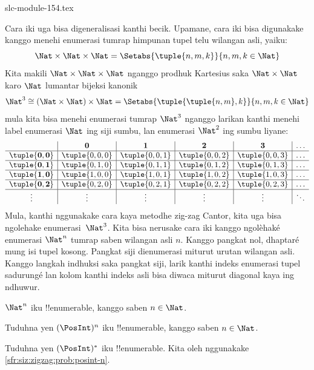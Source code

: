 \begin{filecontents*}[overwrite]{slc-module-154.tex}
\begin{explain}
Cara iki uga bisa digeneralisasi kanthi becik. Upamane, cara iki bisa
digunakake kanggo menehi enumerasi tumrap himpunan tupel telu wilangan asli, yaiku:
\[
\Nat \times \Nat \times \Nat = \Setabs{\tuple{n,m,k}}{n,m,k \in \Nat}
\]
Kita makili $\Nat \times \Nat \times \Nat$ nganggo prodhuk
Kartesius saka $\Nat \times \Nat$ karo $\Nat$ lumantar bijeksi kanonik
\[
\Nat^3 \cong (\Nat \times \Nat) \times \Nat =
\Setabs{\tuple{\tuple{n,m},k}}{n, m, k
  \in \Nat }
\]
mula kita bisa menehi enumerasi tumrap $\Nat^3$ nganggo larikan kanthi menehi label
enumerasi $\Nat$ ing siji sumbu, lan enumerasi
$\Nat^2$ ing sumbu liyane:
\[
\begin{array}{ c | c | c | c | c | c}
& \mathbf 0 & \mathbf 1 & \mathbf 2 & \mathbf 3 & \dots \\
\hline
\mathbf{\tuple{0,0}} & \tuple{0,0,0} & \tuple{0,0,1} & \tuple{0,0,2} & \tuple{0,0,3} & \dots \\
\hline
\mathbf{\tuple{0,1}} & \tuple{0,1,0} & \tuple{0,1,1} & \tuple{0,1,2} & \tuple{0,1,3} & \dots \\
\hline
\mathbf{\tuple{1,0}} & \tuple{1,0,0} & \tuple{1,0,1} & \tuple{1,0,2} & \tuple{1,0,3} & \dots \\
\hline
\mathbf{\tuple{0,2}} & \tuple{0,2,0} & \tuple{0,2,1} & \tuple{0,2,2} & \tuple{0,2,3} & \dots\\
\hline
\vdots & \vdots & \vdots & \vdots & \vdots & \ddots \\
\end{array}
\]
Mula, kanthi nggunakake cara kaya metodhe zig-zag Cantor, kita uga bisa
ngolehake enumerasi~$\Nat^3$. Kita bisa nerusake cara iki kanggo
ngolèhaké enumerasi $\Nat^n$ tumrap saben wilangan asli $n$.
Kanggo pangkat nol, dhaptaré mung isi tupel kosong. Pangkat siji
dienumerasi miturut urutan wilangan asli. Kanggo langkah indhuksi
saka pangkat siji, larik kanthi indeks enumerasi tupel sadurungé lan kolom
kanthi indeks asli bisa diwaca miturut diagonal kaya ing ndhuwur.
\end{explain}

\begin{prop}
$\Nat^n$ iku !!{enumerable}, kanggo saben $n \in \Nat$.
\end{prop}

\begin{prob}\label{sfr:siz:zigzag:prob:posint-n}
Tuduhna yen $(\PosInt)^n$ iku !!{enumerable}, kanggo saben $n \in \Nat$.
\end{prob}

\begin{prob}\label{sfr:siz:zigzag:prob:posint-star}
  Tuduhna yen $(\PosInt)^*$ iku !!{enumerable}. Kita oleh nggunakake \cref{sfr:siz:zigzag:prob:posint-n}.
\end{prob}


\end{filecontents*}

